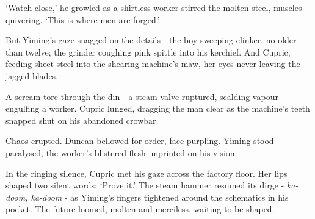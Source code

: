 `Watch close,' he growled as a shirtless worker stirred the molten steel, muscles quivering. `This is where men are forged.'

But Yiming's gaze snagged on the details - the boy sweeping clinker, no older than twelve; the grinder coughing pink spittle into his kerchief. And Cupric, feeding sheet steel into the shearing machine's maw, her eyes never leaving the jagged blades.

A scream tore through the din - a steam valve ruptured, scalding vapour engulfing a worker. Cupric lunged, dragging the man clear as the machine's teeth snapped shut on his abandoned crowbar.

Chaos erupted. Duncan bellowed for order, face purpling. Yiming stood paralysed, the worker's blistered flesh imprinted on his vision.

In the ringing silence, Cupric met his gaze across the factory floor. Her lips shaped two silent words: `Prove it.'
The steam hammer resumed its dirge - \textit{ka-doom, ka-doom} - as Yiming's fingers tightened around the schematics in his pocket. The future loomed, molten and merciless, waiting to be shaped.
